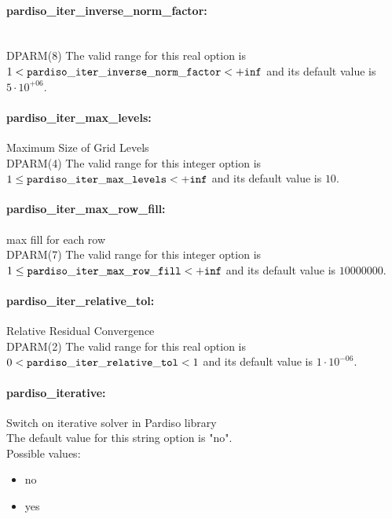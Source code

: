 \paragraph{pardiso\_iter\_inverse\_norm\_factor:}\label{opt:pardiso_iter_inverse_norm_factor} ~ \\
 DPARM(8) The valid range for this real option is 
$1 <  {\tt pardiso\_iter\_inverse\_norm\_factor } <  {\tt +inf}$
and its default value is $5 \cdot 10^{+06}$.


\paragraph{pardiso\_iter\_max\_levels:}\label{opt:pardiso_iter_max_levels} Maximum Size of Grid Levels \\
 DPARM(4) The valid range for this integer option is
$1 \le {\tt pardiso\_iter\_max\_levels } <  {\tt +inf}$
and its default value is $10$.


\paragraph{pardiso\_iter\_max\_row\_fill:}\label{opt:pardiso_iter_max_row_fill} max fill for each row \\
 DPARM(7) The valid range for this integer option is
$1 \le {\tt pardiso\_iter\_max\_row\_fill } <  {\tt +inf}$
and its default value is $10000000$.


\paragraph{pardiso\_iter\_relative\_tol:}\label{opt:pardiso_iter_relative_tol} Relative Residual Convergence \\
 DPARM(2) The valid range for this real option is 
$0 <  {\tt pardiso\_iter\_relative\_tol } <  1$
and its default value is $1 \cdot 10^{-06}$.


\paragraph{pardiso\_iterative:}\label{opt:pardiso_iterative} Switch on iterative solver in Pardiso library \\
 The default value for this string option is "no".
\\ 
Possible values:
\begin{itemize}
   \item no
   \item yes
\end{itemize}


